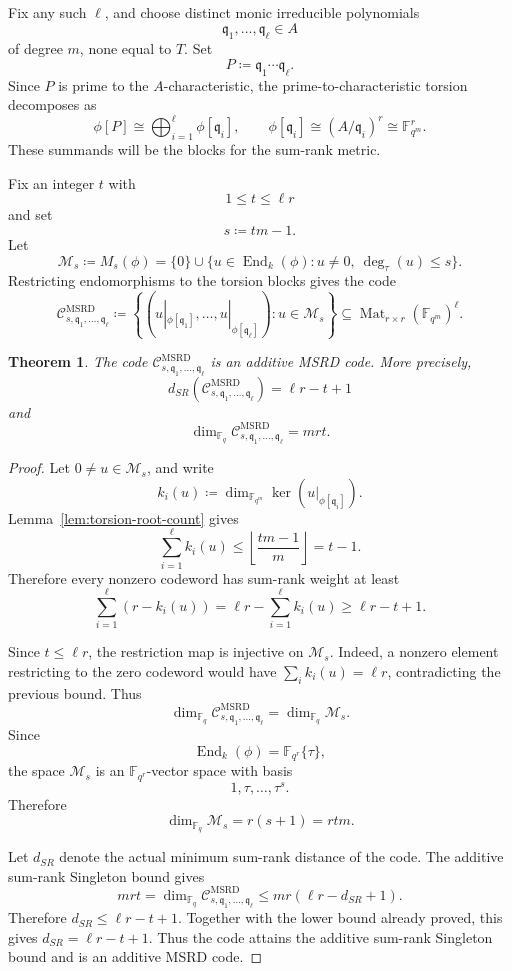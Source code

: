 \documentclass[10pt,a4paper]{amsart}
\DeclareMathOperator{\End}{End}
\DeclareMathOperator{\Mat}{Mat}
\theoremstyle{definition}
\theoremstyle{plain}
\newtheorem{theorem}[definition]{Theorem}
\theoremstyle{remark}
\newcommand{\vF}{\mathbb F}
\begin{document}
Fix any such $\ell$, and choose distinct monic irreducible polynomials
$$
\mathfrak q_1,\ldots,\mathfrak q_\ell\in A
$$
of degree $m$, none equal to $T$. Set
$$
    P\coloneqq \mathfrak q_1\cdots \mathfrak q_\ell.
$$
Since $P$ is prime to the $A$-characteristic, the prime-to-characteristic
torsion decomposes as
$$
    \phi[P]\cong \bigoplus_{i=1}^{\ell}\phi[\mathfrak q_i],
    \qquad
    \phi[\mathfrak q_i]\cong (A/\mathfrak q_i)^r\cong \vF_{q^m}^r.
$$
These summands will be the blocks for the sum-rank metric.

Fix an integer $t$ with
$$
    1\leq t\leq \ell r
$$
and set
$$
    s\coloneqq tm-1.
$$
Let
$$
    \mathcal M_s\coloneqq M_s(\phi)
    =
    \{0\}\cup
    \{u\in \End_k(\phi):u\neq 0,\ \deg_\tau(u)\leq s\}.
$$
Restricting endomorphisms to the torsion blocks gives the code
$$
    \mathcal C^{\mathrm{MSRD}}_{s,\mathfrak q_1,\ldots,\mathfrak q_\ell}
    \coloneqq
    \left\{
    \left(
    u|_{\phi[\mathfrak q_1]},\ldots,u|_{\phi[\mathfrak q_\ell]}
    \right)
    :
    u\in\mathcal M_s
    \right\}
    \subseteq
    \Mat_{r\times r}(\vF_{q^m})^\ell.
$$

\begin{theorem}
\label{thm:explicit-msrd-characteristic-t}
The code
$\mathcal C^{\mathrm{MSRD}}_{s,\mathfrak q_1,\ldots,\mathfrak q_\ell}$ is an
additive MSRD code. More precisely,
$$
    d_{SR}\left(
    \mathcal C^{\mathrm{MSRD}}_{s,\mathfrak q_1,\ldots,\mathfrak q_\ell}
    \right)
    =
    \ell r-t+1
$$
and
$$
    \dim_{\vF_q}
    \mathcal C^{\mathrm{MSRD}}_{s,\mathfrak q_1,\ldots,\mathfrak q_\ell}
    =
    mrt.
$$
\end{theorem}

\begin{proof}
Let $0\neq u\in\mathcal M_s$, and write
$$
    k_i(u)\coloneqq
    \dim_{\vF_{q^m}}\ker\left(u|_{\phi[\mathfrak q_i]}\right).
$$
Lemma~\ref{lem:torsion-root-count} gives
$$
\sum_{i=1}^{\ell}k_i(u)
\leq
\left\lfloor\frac{tm-1}{m}\right\rfloor
=t-1.
$$
Therefore every nonzero codeword has sum-rank weight at least
$$
    \sum_{i=1}^{\ell}(r-k_i(u))
    =
    \ell r-\sum_{i=1}^{\ell}k_i(u)
    \geq
    \ell r-t+1.
$$

Since $t\leq \ell r$, the restriction map is injective on $\mathcal M_s$.
Indeed, a nonzero element restricting to the zero codeword would have
$\sum_i k_i(u)=\ell r$, contradicting the previous bound. Thus
$$
    \dim_{\vF_q}
    \mathcal C^{\mathrm{MSRD}}_{s,\mathfrak q_1,\ldots,\mathfrak q_\ell}
    =
    \dim_{\vF_q}\mathcal M_s.
$$
Since
$$
\End_k(\phi)=\vF_{q^r}\{\tau\},
$$
the space $\mathcal M_s$ is an $\vF_{q^r}$-vector space with basis
$$
1,\tau,\ldots,\tau^s.
$$
Therefore
$$
    \dim_{\vF_q}\mathcal M_s
    =
    r(s+1)
    =
    rtm.
$$

Let $d_{SR}$ denote the actual minimum sum-rank distance of the code.  The
additive sum-rank Singleton bound gives
$$
    mrt
    =
    \dim_{\vF_q}\mathcal C^{\mathrm{MSRD}}_{s,\mathfrak q_1,\ldots,\mathfrak q_\ell}
    \leq
    mr(\ell r-d_{SR}+1).
$$
Therefore $d_{SR}\leq\ell r-t+1$.  Together with the lower bound already
proved, this gives $d_{SR}=\ell r-t+1$.  Thus the code attains the additive
sum-rank Singleton bound and is an additive MSRD code.
\end{proof}
\end{document}
